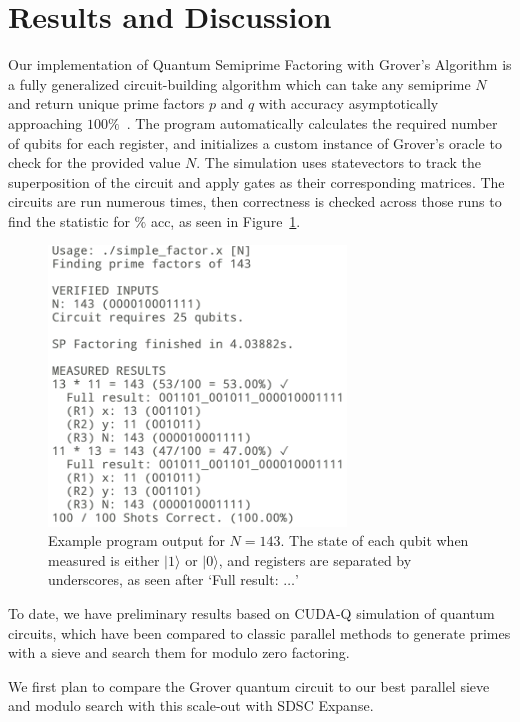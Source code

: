 \documentclass[twocolumn]{cinc}
\begin{document}
\section{Results and Discussion}

Our implementation of Quantum Semiprime Factoring with Grover's Algorithm is a fully
generalized circuit-building algorithm which can take any semiprime $N$ and return
unique prime factors $p$ and $q$ with accuracy asymptotically approaching $100\%$~\cite{quantumfactoring_github}. 
The program automatically calculates the required number of qubits for each register,
and initializes a custom instance of Grover's oracle to check for the provided value $N$.
The simulation uses statevectors to track the superposition of the circuit and apply
gates as their corresponding matrices. The circuits are run numerous times, then
correctness is checked across those runs to find the statistic for $\%$ acc, as seen 
in Figure~\ref{fig:FIGURC1}.

\begin{figure}[ht]\label{fig:FIGURC1}
\centering
\includegraphics[width=7.9cm]{results.png}
\caption{Example program output for $N=143$. The state of each qubit 
when measured is either $|1\rangle$ or $|0\rangle$, and registers are separated by underscores, as seen
after `Full result: $\dots$'}
\end{figure}

To date, we have preliminary results based on CUDA-Q simulation of quantum circuits, 
which have been compared to classic parallel methods to generate primes with a sieve 
and search them for modulo zero factoring. 

We first plan to compare the Grover quantum circuit to our best parallel sieve 
and modulo search with this scale-out with SDSC Expanse.
\end{document}
